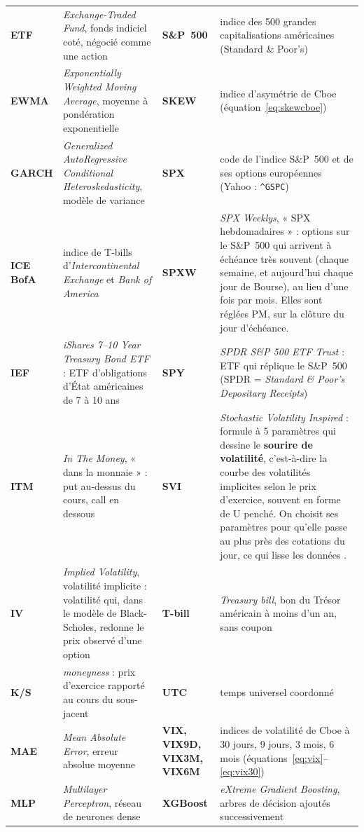 \documentclass[10pt,a4paper]{article}
\begin{document}
{\begin{longtable}{@{}>{\leavevmode\bfseries\color{marine}}L{1.75cm} L{6.6cm} >{\leavevmode\bfseries\color{marine}}L{1.75cm} L{6.6cm}@{}}
ETF & \emph{Exchange-Traded Fund}, fonds indiciel coté, négocié comme une action & S\&P~500 & indice des 500 grandes capitalisations américaines (Standard \& Poor's) \\
EWMA & \emph{Exponentially Weighted Moving Average}, moyenne à pondération exponentielle & SKEW & indice d'asymétrie de Cboe (équation~\ref{eq:skewcboe}) \\
GARCH & \emph{Generalized AutoRegressive Conditional Heteroskedasticity}, modèle de variance \cite{bollerslev} & SPX & code de l'indice S\&P~500 et de ses options européennes (Yahoo : \texttt{\textasciicircum GSPC}) \\
ICE BofA & indice de T-bills d'\emph{Intercontinental Exchange} et \emph{Bank of America} & SPXW & \emph{SPX Weeklys}, « SPX hebdomadaires » : options sur le S\&P~500 qui arrivent à échéance très souvent (chaque semaine, et aujourd'hui chaque jour de Bourse), au lieu d'une fois par mois. Elles sont réglées PM, sur la clôture du jour d'échéance. \\
IEF & \emph{iShares 7–10 Year Treasury Bond ETF} : ETF d'obligations d'État américaines de 7 à 10 ans & SPY & \emph{SPDR S\&P 500 ETF Trust} : ETF qui réplique le S\&P~500 (SPDR = \emph{Standard \& Poor's Depositary Receipts}) \\
ITM & \emph{In The Money}, « dans la monnaie » : put au-dessus du cours, call en dessous & SVI & \emph{Stochastic Volatility Inspired} : formule à 5 paramètres qui dessine le \textbf{sourire de volatilité}, c'est-à-dire la courbe des volatilités implicites selon le prix d'exercice, souvent en forme de U penché. On choisit ses paramètres pour qu'elle passe au plus près des cotations du jour, ce qui lisse les données \cite{gatheraljacquier}. \\
IV & \emph{Implied Volatility}, volatilité implicite : volatilité qui, dans le modèle de Black-Scholes, redonne le prix observé d'une option & T-bill & \emph{Treasury bill}, bon du Trésor américain à moins d'un an, sans coupon \\
K/S & \emph{moneyness} : prix d'exercice rapporté au cours du sous-jacent & UTC & temps universel coordonné \\
MAE & \emph{Mean Absolute Error}, erreur absolue moyenne & VIX, VIX9D, VIX3M, VIX6M & indices de volatilité de Cboe à 30 jours, 9 jours, 3 mois, 6 mois (équations~\ref{eq:vix}–\ref{eq:vix30}) \\
MLP & \emph{Multilayer Perceptron}, réseau de neurones dense & XGBoost & \emph{eXtreme Gradient Boosting}, arbres de décision ajoutés successivement \\

\end{longtable}}
\end{document}
